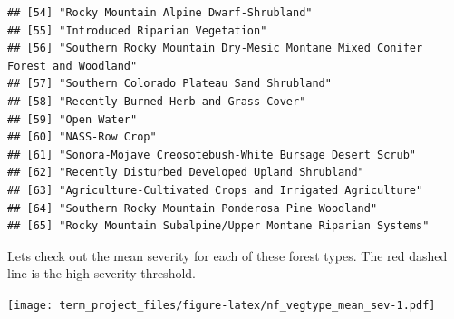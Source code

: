 \documentclass[]{book}
\newenvironment{Shaded}{\begin{snugshade}}{\end{snugshade}}
\newcommand{\DataTypeTok}[1]{\textcolor[rgb]{0.13,0.29,0.53}{#1}}
\newcommand{\DecValTok}[1]{\textcolor[rgb]{0.00,0.00,0.81}{#1}}
\newcommand{\KeywordTok}[1]{\textcolor[rgb]{0.13,0.29,0.53}{\textbf{#1}}}
\newcommand{\NormalTok}[1]{#1}
\newcommand{\OperatorTok}[1]{\textcolor[rgb]{0.81,0.36,0.00}{\textbf{#1}}}
\newcommand{\OtherTok}[1]{\textcolor[rgb]{0.56,0.35,0.01}{#1}}
\newcommand{\StringTok}[1]{\textcolor[rgb]{0.31,0.60,0.02}{#1}}
\begin{document}
\begin{verbatim}
## [54] "Rocky Mountain Alpine Dwarf-Shrubland"                                      
## [55] "Introduced Riparian Vegetation"                                             
## [56] "Southern Rocky Mountain Dry-Mesic Montane Mixed Conifer Forest and Woodland"
## [57] "Southern Colorado Plateau Sand Shrubland"                                   
## [58] "Recently Burned-Herb and Grass Cover"                                       
## [59] "Open Water"                                                                 
## [60] "NASS-Row Crop"                                                              
## [61] "Sonora-Mojave Creosotebush-White Bursage Desert Scrub"                      
## [62] "Recently Disturbed Developed Upland Shrubland"                              
## [63] "Agriculture-Cultivated Crops and Irrigated Agriculture"                     
## [64] "Southern Rocky Mountain Ponderosa Pine Woodland"                            
## [65] "Rocky Mountain Subalpine/Upper Montane Riparian Systems"
\end{verbatim}

Lets check out the mean severity for each of these forest types.
The red dashed line is the high-severity threshold.

\begin{Shaded}
\end{Shaded}

\texttt{[image: term\_project\_files/figure-latex/nf\_vegtype\_mean\_sev-1.pdf]}


\end{document}
